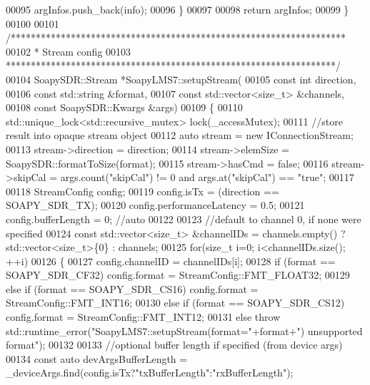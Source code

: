 \begin{DoxyCode}
00095         argInfos.push\_back(info);
00096     \}
00097 
00098     \textcolor{keywordflow}{return} argInfos;
00099 \}
00100 
00101 \textcolor{comment}{/*******************************************************************}
00102 \textcolor{comment}{ * Stream config}
00103 \textcolor{comment}{ ******************************************************************/}
00104 SoapySDR::Stream *SoapyLMS7::setupStream(
00105     \textcolor{keyword}{const} \textcolor{keywordtype}{int} direction,
00106     \textcolor{keyword}{const} std::string &format,
00107     \textcolor{keyword}{const} std::vector<size\_t> &channels,
00108     \textcolor{keyword}{const} SoapySDR::Kwargs &args)
00109 \{
00110     std::unique\_lock<std::recursive\_mutex> lock(\_accessMutex);
00111     \textcolor{comment}{//store result into opaque stream object}
00112     \textcolor{keyword}{auto} stream = \textcolor{keyword}{new} IConnectionStream;
00113     stream->direction = direction;
00114     stream->elemSize = SoapySDR::formatToSize(format);
00115     stream->hasCmd = \textcolor{keyword}{false};
00116     stream->skipCal = args.count(\textcolor{stringliteral}{"skipCal"}) != 0 and args.at(\textcolor{stringliteral}{"skipCal"}) == \textcolor{stringliteral}{"true"};
00117 
00118     StreamConfig config;
00119     config.isTx = (direction == SOAPY_SDR_TX);
00120     config.performanceLatency = 0.5;
00121     config.bufferLength = 0; \textcolor{comment}{//auto}
00122 
00123     \textcolor{comment}{//default to channel 0, if none were specified}
00124     \textcolor{keyword}{const} std::vector<size\_t> &channelIDs = channels.empty() ? std::vector<size\_t>\{0\} : channels;
00125     \textcolor{keywordflow}{for}(\textcolor{keywordtype}{size\_t} i=0; i<channelIDs.size(); ++i)
00126     \{
00127         config.channelID = channelIDs[i];
00128         \textcolor{keywordflow}{if} (format == SOAPY_SDR_CF32) config.format = StreamConfig::FMT_FLOAT32;
00129         \textcolor{keywordflow}{else} \textcolor{keywordflow}{if} (format == SOAPY_SDR_CS16) config.format = 
      StreamConfig::FMT_INT16;
00130         \textcolor{keywordflow}{else} \textcolor{keywordflow}{if} (format == SOAPY_SDR_CS12) config.format = 
      StreamConfig::FMT_INT12;
00131         \textcolor{keywordflow}{else} \textcolor{keywordflow}{throw} std::runtime\_error(\textcolor{stringliteral}{"SoapyLMS7::setupStream(format="}+format+\textcolor{stringliteral}{") unsupported format"});
00132 
00133         \textcolor{comment}{//optional buffer length if specified (from device args)}
00134         \textcolor{keyword}{const} \textcolor{keyword}{auto} devArgsBufferLength = \_deviceArgs.find(config.isTx?\textcolor{stringliteral}{"txBufferLength"}:\textcolor{stringliteral}{"rxBufferLength"});

\end{DoxyCode}
